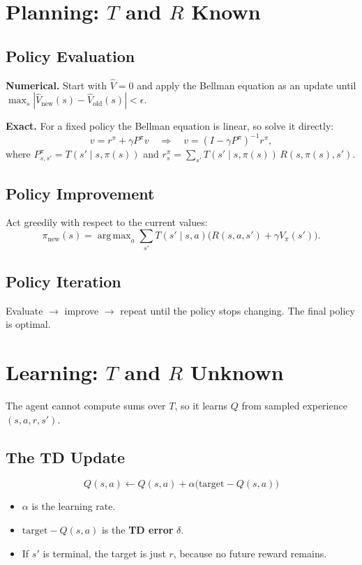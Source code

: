 \documentclass[11pt]{article}
\DeclareMathOperator*{\argmax}{arg\,max}
\begin{document}
\section{Planning: $T$ and $R$ Known}

\subsection{Policy Evaluation}

\textbf{Numerical.} Start with $\hat{V} = 0$ and apply the Bellman equation as an
update until
$\max_s |\hat{V}_{\text{new}}(s) - \hat{V}_{\text{old}}(s)| < \epsilon$.

\textbf{Exact.} For a fixed policy the Bellman equation is linear, so solve it directly:
\[
  v = r^\pi + \gamma P^\pi v
  \quad \Longrightarrow \quad
  v = (I - \gamma P^\pi)^{-1} r^\pi,
\]
where $P^\pi_{s,s'} = T(s' \mid s, \pi(s))$ and
$r^\pi_s = \sum_{s'} T(s' \mid s, \pi(s))\, R(s, \pi(s), s')$.

\subsection{Policy Improvement}

Act greedily with respect to the current values:
\[
  \pi_{\text{new}}(s) = \argmax_a \sum_{s'} T(s' \mid s,a)
                        \big( R(s,a,s') + \gamma V_\pi(s') \big).
\]

\subsection{Policy Iteration}

Evaluate $\rightarrow$ improve $\rightarrow$ repeat until the policy stops changing.
The final policy is optimal.

\section{Learning: $T$ and $R$ Unknown}

The agent cannot compute sums over $T$, so it learns $Q$ from sampled experience
$(s, a, r, s')$.

\subsection{The TD Update}

\[
  Q(s,a) \leftarrow Q(s,a) + \alpha \big( \text{target} - Q(s,a) \big)
\]

\begin{itemize}
  \item $\alpha$ is the learning rate.
  \item $\text{target} - Q(s,a)$ is the \textbf{TD error} $\delta$.
  \item If $s'$ is terminal, the target is just $r$, because no future reward remains.
\end{itemize}
\end{document}
